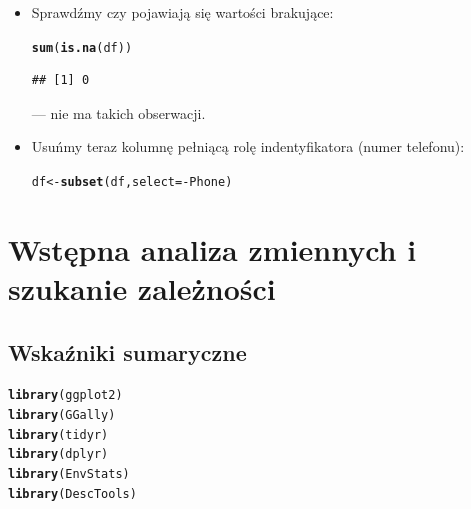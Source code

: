 \documentclass{article}\usepackage[]{graphicx}\usepackage[]{color}
\makeatletter
\newcommand{\hlopt}[1]{\textcolor[rgb]{0,0,0}{#1}}%
\newcommand{\hlstd}[1]{\textcolor[rgb]{0.345,0.345,0.345}{#1}}%
\newcommand{\hlkwb}[1]{\textcolor[rgb]{0.69,0.353,0.396}{#1}}%
\newcommand{\hlkwc}[1]{\textcolor[rgb]{0.333,0.667,0.333}{#1}}%
\newcommand{\hlkwd}[1]{\textcolor[rgb]{0.737,0.353,0.396}{\textbf{#1}}}%
\newenvironment{kframe}{%
 \def\at@end@of@kframe{}%
 \ifinner\ifhmode%
  \def\at@end@of@kframe{\end{minipage}}%
  \begin{minipage}{\columnwidth}%
 \fi\fi%
 \def\FrameCommand##1{\hskip\@totalleftmargin \hskip-\fboxsep
 \colorbox{shadecolor}{##1}\hskip-\fboxsep
     \hskip-\linewidth \hskip-\@totalleftmargin \hskip\columnwidth}%
 \MakeFramed {\advance\hsize-\width
   \@totalleftmargin\z@ \linewidth\hsize
   \@setminipage}}%
 {\par\unskip\endMakeFramed%
 \at@end@of@kframe}
\newenvironment{knitrout}{}{} %
\makeatother
\begin{document}
\begin{itemize}
\item Sprawdźmy czy pojawiają się wartości brakujące:
\begin{knitrout}
\color{fgcolor}\begin{kframe}
\begin{alltt}
\hlkwd{sum}\hlstd{(}\hlkwd{is.na}\hlstd{(df))}
\end{alltt}
\begin{verbatim}
## [1] 0
\end{verbatim}
\end{kframe}
\end{knitrout}
--- nie ma takich obserwacji.
\item Usuńmy teraz kolumnę pełniącą rolę indentyfikatora (numer telefonu):
\begin{knitrout}
\color{fgcolor}\begin{kframe}
\begin{alltt}
\hlstd{df} \hlkwb{<-} \hlkwd{subset}\hlstd{(df,} \hlkwc{select}\hlstd{=}\hlopt{-}\hlstd{Phone)}
\end{alltt}
\end{kframe}
\end{knitrout}

\end{itemize}

\section{Wstępna analiza zmiennych i szukanie zależności}

\subsection{Wskaźniki sumaryczne}


\begin{knitrout}
\color{fgcolor}\begin{kframe}
\begin{alltt}
\hlkwd{library}\hlstd{(ggplot2)}
\hlkwd{library}\hlstd{(GGally)}
\hlkwd{library}\hlstd{(tidyr)}
\hlkwd{library}\hlstd{(dplyr)}
\hlkwd{library}\hlstd{(EnvStats)}
\hlkwd{library}\hlstd{(DescTools)}
\end{alltt}
\end{kframe}
\end{knitrout}
\end{document}
